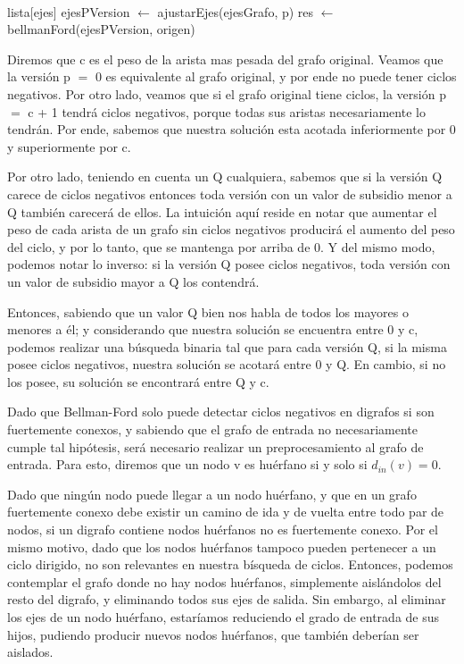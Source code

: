 \\
\par
\begin{algorithm}[H]
		\NoCaptionOfAlgo
		\caption{}
		
		lista[ejes] ejesPVersion $\leftarrow$ ajustarEjes(ejesGrafo, p)
		res $\leftarrow$ bellmanFord(ejesPVersion, origen)		

	\end{algorithm}

Diremos que c es el peso de la arista mas pesada del grafo original. Veamos que la versión p $=$ 0 es equivalente al grafo original, y por ende no puede tener ciclos negativos. Por otro lado, veamos que si el grafo original tiene ciclos, la versión p $=$ c + 1 tendrá ciclos negativos, porque todas sus aristas necesariamente lo tendrán. Por ende, sabemos que nuestra solución esta acotada inferiormente por 0 y superiormente por c.
\\
\par
Por otro lado, teniendo en cuenta un Q cualquiera, sabemos que si la versión Q carece de ciclos negativos entonces toda versión con un valor de subsidio menor a Q también carecerá de ellos. La intuición aquí reside en notar que aumentar el peso de cada arista de un grafo sin ciclos negativos producirá el aumento del peso del ciclo, y por lo tanto, que se mantenga por arriba de 0. Y del mismo modo, podemos notar lo inverso: si la versión Q posee ciclos negativos, toda versión con un valor de subsidio mayor a Q los contendrá.
\\
\par
Entonces, sabiendo que un valor Q bien nos habla de todos los mayores o menores a él; y considerando que nuestra solución se encuentra entre 0 y c, podemos realizar una búsqueda binaria tal que para cada versión Q, si la misma posee ciclos negativos, nuestra solución se acotará entre 0 y Q. En cambio, si no los posee, su solución se encontrará entre Q y c.
\\
\par
Dado que Bellman-Ford solo puede detectar ciclos negativos en digrafos si son fuertemente conexos, y sabiendo que el grafo de entrada no necesariamente cumple tal hipótesis, será necesario realizar un preprocesamiento al grafo de entrada. Para esto, diremos que un nodo v es huérfano si y solo si $d_{in} (v) = 0$.
\\
\par
Dado que ningún nodo puede llegar a un nodo huérfano, y que en un grafo fuertemente conexo debe existir un camino de ida y de vuelta entre todo par de nodos, si un digrafo contiene nodos huérfanos no es fuertemente conexo. Por el mismo motivo, dado que los nodos huérfanos tampoco pueden pertenecer a un ciclo dirigido, no son relevantes en nuestra bísqueda de ciclos. Entonces, podemos contemplar el grafo donde no hay nodos huérfanos, simplemente aislándolos del resto del digrafo, y eliminando todos sus ejes de salida. Sin embargo, al eliminar los ejes de un nodo huérfano, estaríamos reduciendo el grado de entrada de sus hijos, pudiendo producir nuevos nodos huérfanos, que también deberían ser aislados.
